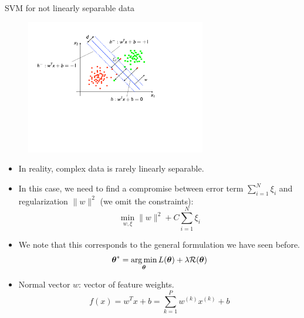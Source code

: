 \documentclass[xcolor=pdftex,dvipsnames,table]{beamer}
\begin{document}
\begin{frame}{SVM for not linearly separable data}
	\begin{figure}[htb]
		\includegraphics[width=0.7\textwidth]{../graphics/SVM3.pdf}
	\end{figure}
	\begin{itemize}
		\item In reality, complex data is rarely linearly separable.
		\item In this case, we need to find a compromise between error term $\sum_{i=1}^{N}\xi_i$ and regularization $\|w\|^2$ (we omit the constraints):
		\begin{equation*}
			\min_{w,\xi} \|w\|^2 + C \sum_{i=1}^{N}\xi_i
		\end{equation*}
		\item We note that this corresponds to the general formulation we have seen before.
 		\begin{equation*}
 			\boldsymbol{\theta} ^{\ast} = \operatorname*{arg\,min}_{\boldsymbol{\theta}} L (\boldsymbol{\theta}) + \lambda \mathcal{R}(\boldsymbol{\theta})
 		\end{equation*}
		\item Normal vector $w$: vector of feature weights.
		\begin{equation*}
			f(x) = w^Tx + b = \sum_{k=1}^{P}w^{(k)}x^{(k)} + b
		\end{equation*}
	\end{itemize}
\end{frame}
\end{document}
